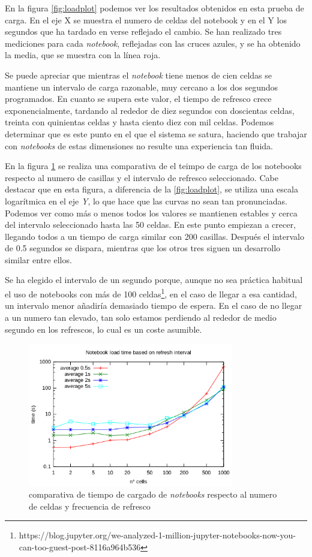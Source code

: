 \documentclass[11pt,spanish,listoffigures]{tfgetsinf}
\begin{document}
En la figura \ref{fig:loadplot} podemos ver los resultados obtenidos en esta prueba de carga. En el eje X se muestra el numero de celdas del notebook y en el Y los segundos que ha tardado en verse reflejado el cambio. Se han realizado tres mediciones para cada \textit{notebook}, reflejadas con las cruces azules, y se ha obtenido la media, que se muestra con la línea roja.

Se puede apreciar que mientras el \textit{notebook} tiene menos de cien celdas se mantiene un intervalo de carga razonable, muy cercano a los dos segundos programados. En cuanto se supera este valor, el tiempo de refresco crece exponencialmente, tardando al rededor de diez segundos con doscientas celdas, treinta con quinientas celdas y hasta ciento diez con mil celdas. Podemos determinar que es este punto en el que el sistema se satura, haciendo que trabajar con \textit{notebooks} de estas dimensiones no resulte una experiencia tan fluida.

En la figura \ref{fig:load-compare} se realiza una comparativa de el teimpo de carga de los notebooks respecto al numero de casillas y el intervalo de refresco seleccionado. Cabe destacar que en esta figura, a diferencia de la \ref{fig:loadplot}, se utiliza una escala logarítmica en el eje \textit{Y}, lo que hace que las curvas no sean tan pronunciadas. Podemos ver como más o menos todos los valores se mantienen estables y cerca del intervalo seleccionado hasta las 50 celdas. En este punto empiezan a crecer, llegando todos a un tiempo de carga similar con 200 casillas. Después el intervalo de 0.5 segundos se dispara, mientras que los otros tres siguen un desarrollo similar entre ellos.

Se ha elegido el intervalo de un segundo porque, aunque no sea práctica habitual el uso de notebooks con más de 100 celdas\footnote{https://blog.jupyter.org/we-analyzed-1-million-jupyter-notebooks-now-you-can-too-guest-post-8116a964b536}, en el caso de llegar a esa cantidad, un intervalo menor añadiría demasiado tiempo de espera. En el caso de no llegar a un numero tan elevado, tan solo estamos perdiendo al rededor de medio segundo en los refrescos, lo cual es un coste asumible.

\begin{figure}[H]
	\centering
  	\includegraphics[width=0.8\textwidth]{all.png}
  	\caption{comparativa de tiempo de cargado de \textit{notebooks} respecto al numero de celdas y frecuencia de refresco}
  	\label{fig:load-compare}
\end{figure}
\end{document}
